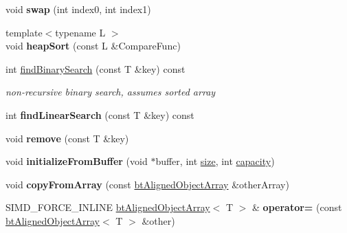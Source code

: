 \begin{DoxyCompactItemize}
\mbox{\label{classbtAlignedObjectArray_a4aeacaa461686c9394aabd3c139179b4}} 
void {\bfseries swap} (int index0, int index1)
\item 
\mbox{\label{classbtAlignedObjectArray_aa0979d77c9b1e397d656a0b1ef88b4e6}} 
{\footnotesize template$<$typename L $>$ }\\void {\bfseries heap\+Sort} (const L \&Compare\+Func)
\item 
\mbox{\label{classbtAlignedObjectArray_ac63dc886b2cb46a2e1084b0d9d0dbdb3}} 
int \hyperlink{classbtAlignedObjectArray_ac63dc886b2cb46a2e1084b0d9d0dbdb3}{find\+Binary\+Search} (const T \&key) const
\begin{DoxyCompactList}\small\item\em non-\/recursive binary search, assumes sorted array \end{DoxyCompactList}\item 
\mbox{\label{classbtAlignedObjectArray_a2643f69d951072a370493392f9d13e5b}} 
int {\bfseries find\+Linear\+Search} (const T \&key) const
\item 
\mbox{\label{classbtAlignedObjectArray_a6782242f06df5bab0cffbd23195cd9cd}} 
void {\bfseries remove} (const T \&key)
\item 
\mbox{\label{classbtAlignedObjectArray_aa8d21bd5fe47cfe0216990b78fef665e}} 
void {\bfseries initialize\+From\+Buffer} (void $\ast$buffer, int \hyperlink{classbtAlignedObjectArray_a31de8d83d29c6edd1493fc583091194c}{size}, int \hyperlink{classbtAlignedObjectArray_a1baf76f9f52df3c2d742194ba33e8788}{capacity})
\item 
\mbox{\label{classbtAlignedObjectArray_a1464bd66b0e5e3880b4c7aa4a2ce13a1}} 
void {\bfseries copy\+From\+Array} (const \hyperlink{classbtAlignedObjectArray}{bt\+Aligned\+Object\+Array} \&other\+Array)
\item 
\mbox{\label{classbtAlignedObjectArray_ab6ea335622f18386671194eb6bd6a41b}} 
S\+I\+M\+D\+\_\+\+F\+O\+R\+C\+E\+\_\+\+I\+N\+L\+I\+NE \hyperlink{classbtAlignedObjectArray}{bt\+Aligned\+Object\+Array}$<$ T $>$ \& {\bfseries operator=} (const \hyperlink{classbtAlignedObjectArray}{bt\+Aligned\+Object\+Array}$<$ T $>$ \&other)

\end{DoxyCompactItemize}

